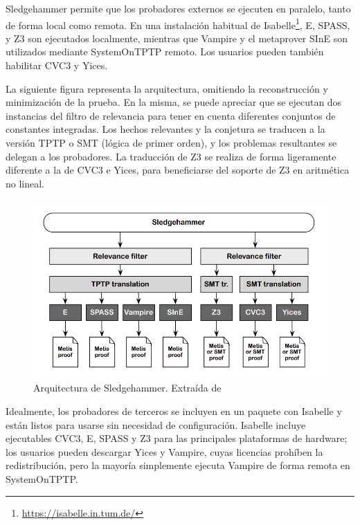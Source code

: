 \documentclass[12pt]{book}
\begin{document}
Sledgehammer permite que los probadores externos se ejecuten en paralelo, tanto de forma local como remota. En una instalación habitual de Isabelle\footnote{\href{https://isabelle.in.tum.de/}{https://isabelle.in.tum.de/}}, E, SPASS, y Z3 son ejecutados localmente, mientras que Vampire y el metaprover SInE son utilizados mediante SystemOnTPTP remoto. Los usuarios pueden también habilitar CVC3 y Yices.

La siguiente figura representa la arquitectura, omitiendo la reconstrucción y minimización de la prueba. En la misma, se puede apreciar que se ejecutan dos instancias del filtro de relevancia para tener en cuenta diferentes conjuntos de constantes integradas. Los hechos relevantes y la conjetura se traducen a la versión TPTP o SMT (lógica de primer orden), y los problemas resultantes se delegan a los probadores. La traducción de Z3 se realiza de forma ligeramente diferente a la de CVC3 e Yices, para beneficiarse del soporte de Z3 en aritmética no lineal.

\begin{figure}[H]
	\centering
	\includegraphics[width=\textwidth]{Sledgehammer_arquitecture.png}
	\caption{Arquitectura de Sledgehammer. Extraída de~\cite{proof_and_disproof}}\label{fig:Sledgehammer_arquitecture}
\end{figure}

Idealmente, los probadores de terceros se incluyen en un paquete con Isabelle y están listos para usarse sin necesidad de configuración. Isabelle incluye ejecutables CVC3, E, SPASS y Z3 para las principales plataformas de hardware; los usuarios pueden descargar Yices y Vampire, cuyas licencias prohíben la redistribución, pero la mayoría simplemente ejecuta Vampire de forma remota en SystemOnTPTP.\@
\end{document}
